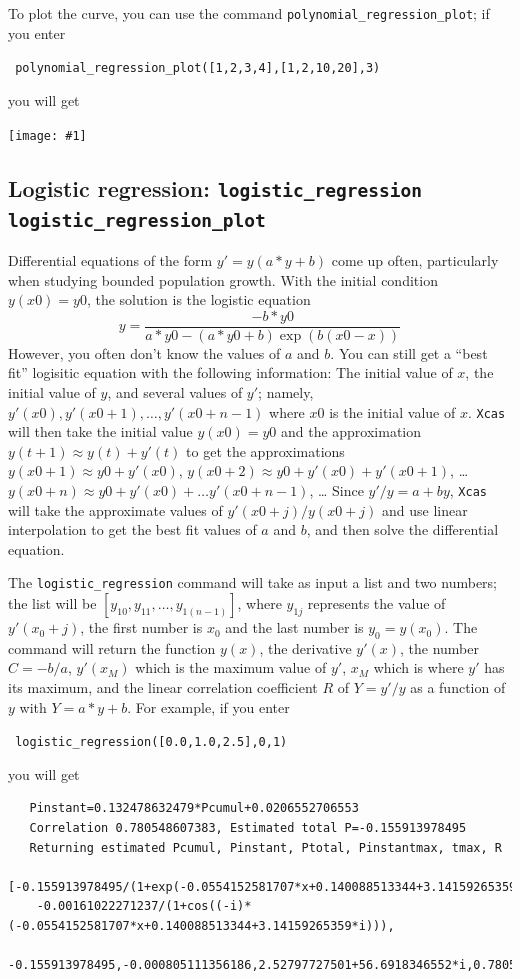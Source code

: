 \documentclass[a4paper,11pt]{book}
\newcommand{\includeimage}[1]
{\texttt{[image: \#1]}}
\begin{document}
To plot the curve, you can use the command
\texttt{polynomial\_regression\_plot}; if you enter
\begin{center}
  \tt
    polynomial\_regression\_plot([1,2,3,4],[1,2,10,20],3)
\end{center}
you will get
\begin{center}
  \includeimage{xcas-polyregplot.png}
\end{center}

\subsection{Logistic regression: \texttt{logistic\_regression} \texttt{logistic\_regression\_plot}}

Differential equations of the form $y' = y(a*y + b)$ come up often,
particularly when studying bounded population growth.  With the
initial condition $y(x0) = y0$, the solution is the logistic equation
\[
y = \frac{-b*y0}{a*y0 - (a*y0+b)\exp(b(x0-x))}
\]
However, you often don't know the values of $a$ and $b$.  You can
still get a ``best fit'' logisitic equation with the following
information:  The initial value of $x$, the initial value of $y$, and
several values of $y'$; namely, $y'(x0),y'(x0+1),\dots,y'(x0+n-1)$ where
$x0$ is the initial value of $x$.   \texttt{Xcas} will then take the
initial value $y(x0) = y0$ and the approximation $y(t+1) \approx y(t)
+ y'(t)$ to get the approximations $y(x0+1) \approx y0 + y'(x0)$,
$y(x0+2) \approx y0 + y'(x0) + y'(x0+1)$, \ldots
$y(x0+n) \approx y0 + y'(x0) +\dots  y'(x0+n-1)$, \ldots
Since $y'/y = a + by$, \texttt{Xcas} will take the
approximate values of $y'(x0+j)/y(x0+j)$ and use linear interpolation
to get the best fit values of $a$ and $b$, and then solve the
differential equation.

The \texttt{logistic\_regression} command will take as input a list
and two numbers; the list will be $[y_{10},y_{11},\dots,y_{1(n-1)}]$, 
where $y_{1j}$ represents the value of $y'(x_0 + j)$, 
the first number is $x_0$ and the last number is
$y_0=y(x_0)$.  The command will return the function $y(x)$, the
derivative $y'(x)$, the number $C=-b/a$, $y'(x_M)$ which is the maximum value
of $y'$, $x_M$ which is where $y'$ has its maximum, and the linear
correlation coefficient $R$ of $Y=y'/y$ as a function of $y$ with $Y=a*y
+ b$.  For example, if you enter
\begin{center}
  \tt
  logistic\_regression([0.0,1.0,2.5],0,1)
\end{center}
you will get
\begin{verbatim}
   Pinstant=0.132478632479*Pcumul+0.0206552706553
   Correlation 0.780548607383, Estimated total P=-0.155913978495
   Returning estimated Pcumul, Pinstant, Ptotal, Pinstantmax, tmax, R
   [-0.155913978495/(1+exp(-0.0554152581707*x+0.140088513344+3.14159265359*i)),
    -0.00161022271237/(1+cos((-i)*(-0.0554152581707*x+0.140088513344+3.14159265359*i))),
    -0.155913978495,-0.000805111356186,2.52797727501+56.6918346552*i,0.780548607383]
\end{verbatim}
\end{document}
